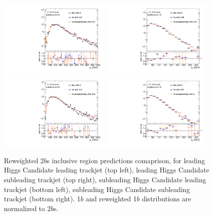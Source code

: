 \begin{figure}[htbp!]
\begin{center}
\includegraphics[angle=270, width=0.48\textwidth]{./figures/boosted/AppendixReweight/Compare/Dijet_Incl_directcompare_leadHCand_trk0_Pt_1.pdf}
\includegraphics[angle=270, width=0.48\textwidth]{./figures/boosted/AppendixReweight/Compare/Dijet_Incl_directcompare_leadHCand_trk1_Pt_1.pdf}\\
\includegraphics[angle=270, width=0.48\textwidth]{./figures/boosted/AppendixReweight/Compare/Dijet_Incl_directcompare_sublHCand_trk0_Pt_1.pdf}
\includegraphics[angle=270, width=0.48\textwidth]{./figures/boosted/AppendixReweight/Compare/Dijet_Incl_directcompare_sublHCand_trk1_Pt_1.pdf}\\
\caption{Reweighted 2$b$s inclusive region predictions comaprison, for leading Higgs Candidate leading trackjet \pt (top left),  leading Higgs Candidate subleading trackjet \pt (top right), subleading Higgs Candidate leading trackjet \pt (bottom left), subleading Higgs Candidate subleading trackjet \pt (bottom right). 1$b$ and reweighted 1$b$ distributions are normalized to 2$b$s.}
\label{fig:app-rw-comp-dijet-2bs-trkjet}
\end{center}
\end{figure}

